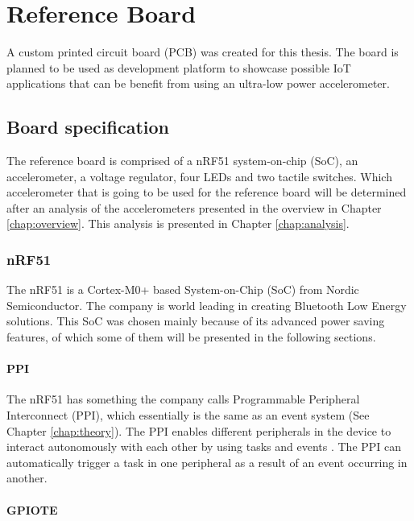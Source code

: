 \chapter{Reference Board}
\label{chap:reference}

A custom printed circuit board (PCB) was created for this thesis. The board is planned to be used as development platform to showcase possible IoT applications that can be benefit from using an ultra-low power accelerometer.

\section{Board specification}

The reference board is comprised of a nRF51 system-on-chip (SoC), an accelerometer, a voltage regulator, four LEDs and two tactile switches. Which accelerometer that is going to be used for the reference board will be determined after an analysis of the accelerometers presented in the overview in Chapter \ref{chap:overview}. This analysis is presented in Chapter \ref{chap:analysis}.


\subsection{nRF51}

The nRF51 is a Cortex-M0+ based System-on-Chip (SoC) from Nordic Semiconductor. The company is world leading in creating Bluetooth Low Energy solutions. This SoC was chosen mainly because of its advanced power saving features, of which some of them will be presented in the following sections. 

\subsubsection{PPI}

The nRF51 has something the company calls Programmable Peripheral Interconnect (PPI), which essentially is the same as an event system (See Chapter \ref{chap:theory}). The PPI enables different peripherals in the device to interact autonomously with each other by using tasks and events \cite[~p.26]{nrf51}. The PPI can automatically trigger a task in one peripheral as a result of an event occurring in another. 

\subsubsection{GPIOTE}

